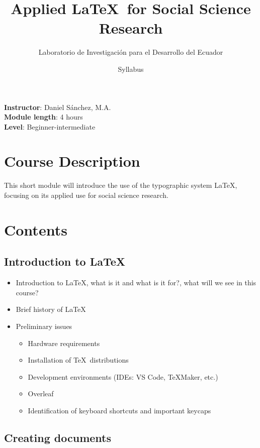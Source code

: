 \documentclass[a4paper,12pt]{article}
\title{Applied \LaTeX \ for Social Science Research}
\author{Laboratorio de Investigación para el Desarrollo del Ecuador}
\date{Syllabus}
\begin{document}
\maketitle

\noindent \textbf{Instructor}: Daniel Sánchez, M.A. \\
\textbf{Module length}: 4 hours \\
\textbf{Level}: Beginner-intermediate

\section{Course Description}

This short module will introduce the use of the typographic system \LaTeX, focusing on its applied use for social science research.

\section{Contents}

\subsection{Introduction to \LaTeX}

\begin{itemize}
    \item Introduction to \LaTeX, what is it and what is it for?, what will we see in this course?
    \item Brief history of \LaTeX
    \item Preliminary issues
    \begin{itemize}
        \item Hardware requirements
        \item Installation of \TeX \ distributions
        \item Development environments (IDEs: VS Code, \TeX Maker, etc.)
        \item Overleaf
        \item Identification of keyboard shortcuts and important keycaps
    \end{itemize}
\end{itemize}

\subsection{Creating documents}
\end{document}
